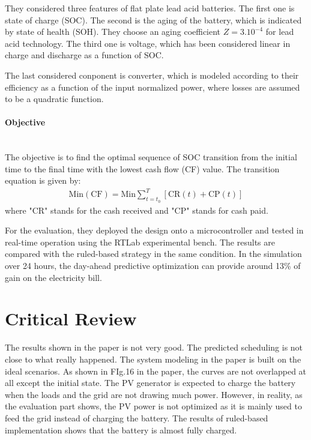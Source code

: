 \documentclass[11pt]{article}
\begin{document}
They considered three features of flat plate lead acid batteries. The first one is state of charge (SOC). The second is the aging of the battery, which is indicated by state of health (SOH). They choose an aging coefficient $Z = 3.10^{-4}$ for lead acid technology. The third one is voltage, which has been considered linear in charge and discharge as a function of SOC.

The last considered conponent is converter, which is modeled according to their efficiency as a function of the input normalized power, where losses are assumed to be a quadratic function.

\paragraph{Objective} \mbox{} \\
The objective is to find the optimal sequence of SOC transition from the initial time to the final time with the lowest cash flow (CF) value. The transition equation is given by:
\begin{gather*}
  \mathrm{Min(CF)} = \mathrm{Min} \sum_{t=t_0}^T [\mathrm{CR}(t) + \mathrm{CP}(t)]
\end{gather*}
where "CR" stands for the cash received and "CP" stands for cash paid.

For the evaluation, they deployed the design onto a microcontroller and tested in real-time operation using the RTLab experimental bench. The results are compared with the ruled-based strategy in the same condition. In the simulation over 24 hours, the day-ahead predictive optimization can provide around 13\% of gain on the electricity bill.

\section{Critical Review}
The results shown in the paper is not very good. The predicted scheduling is not close to what really happened. The system modeling in the paper is built on the ideal scenarios. As shown in FIg.16 in the paper, the curves are not overlapped at all except the initial state. The PV generator is expected to charge the battery when the loads and the grid are not drawing much power. However, in reality, as the evaluation part shows, the PV power is not optimized as it is mainly used to feed the grid instead of charging the battery. The results of ruled-based implementation shows that the battery is almost fully charged.
\end{document}

